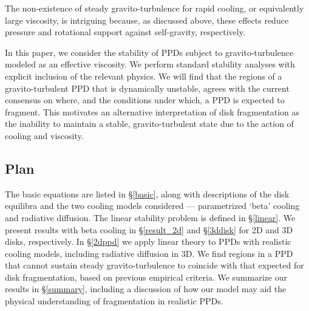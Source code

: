 \documentclass[iop, numberedappendix]{emulateapj}
\begin{document}
The non-existence of steady gravito-turbulence for rapid cooling, or
equivalently large viscosity, is intriguing because, as discussed
above, these effects reduce pressure and rotational support 
against self-gravity, respectively. 

In this paper, we consider the stability of PPDs subject to 
gravito-turbulence modeled as an effective viscosity. 
We perform standard stability analyses with explicit inclusion of the
relevant physics. 
We will find that the
regions of a gravito-turbulent PPD that is dynamically unstable,
agrees with the current consensus on where, and the conditions under
which, a PPD is expected to fragment. This motivates an alternative 
interpretation of disk fragmentation as the inability to maintain a
stable, gravito-turbulent state due to the action of cooling and
viscosity.  














\subsection{Plan}

The basic equations are listed in \S\ref{basic}, along with
descriptions of the disk 
equilibra and the two cooling models 
considered --- parametrized `beta' cooling and radiative diffusion. 
The linear stability problem is defined in
\S\ref{linear}. We present results with beta cooling in
\S\ref{result_2d} and \S\ref{3ddisk} for 2D and 3D disks,
respectively. %
In
\S\ref{2dppd} we apply linear theory to PPDs with realistic cooling
models, including radiative diffusion in 3D. We find regions in a
PPD that cannot sustain steady gravito-turbulence to coincide with
that expected for disk fragmentation, based on previous empirical
criteria. We summarize our results in \S\ref{summary}, including a
discussion of how our model may aid the physical understanding of  
fragmentation in realistic PPDs. 





 




\appendix




\end{document}
